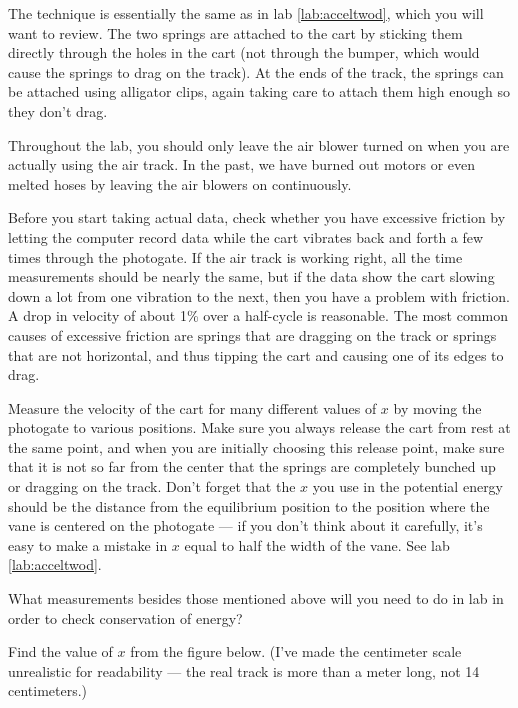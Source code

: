 \observations

The technique is essentially the same as in lab \ref{lab:acceltwod}, which you will want
to review. The two
springs are attached to the cart by sticking them directly
through the holes in the cart (not through the bumper, which
would cause the springs to drag on  the track). At the ends
of the track, the springs can be attached using alligator
clips, again taking care to attach them high enough so they
don't drag.

Throughout the lab, you should only leave the air blower
turned on when you are actually using the air track. In the
past, we have burned out motors or even melted hoses by
leaving the air blowers on continuously.

Before you start taking actual data, check whether you have
excessive friction by letting the computer record data while
the cart vibrates back and forth a few times through the
photogate. If the air track is working right, all the time
measurements should be nearly the same, but if the data show
the cart slowing down a lot from one vibration to the next,
then you have a problem with friction. A drop in velocity of
about 1\% over a half-cycle is reasonable. The most common
causes of excessive friction are springs that are dragging
on the track or springs that are not horizontal, and thus
tipping the cart and causing one of its edges to drag.

Measure the velocity of the cart for many different values
of $x$ by moving the photogate to various positions. Make
sure you always release the cart from rest at the same
point, and when you are initially choosing this release
point, make sure that it is not so far from the center that
the springs are completely bunched up or dragging on the
track. Don't forget that the $x$ you use in the potential
energy should be the distance from the equilibrium position
to the position where the vane is centered on the photogate
--- if you don't think about it carefully, it's easy to make
a mistake in $x$ equal to half the width of the vane.
See lab \ref{lab:acceltwod}.

\prelab

\prelabquestion  What measurements besides those mentioned above will you
need to do in lab in order to check conservation of energy?

\prelabquestion Find the value of $x$ from the figure below. (I've made the
centimeter scale unrealistic for readability --- the real track is
more than a meter long, not 14 centimeters.)

